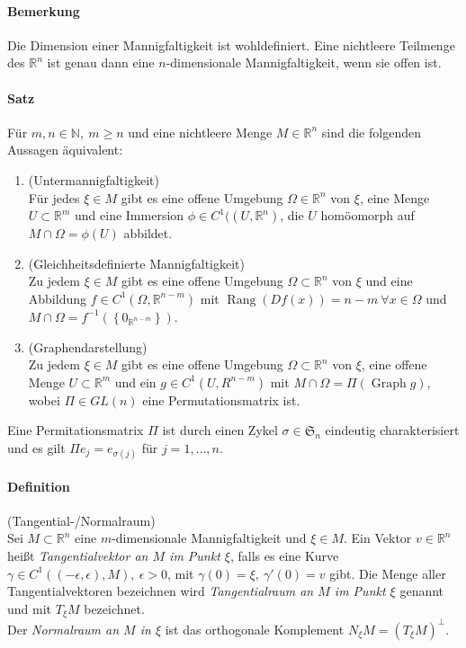 \documentclass[12pt,a4paper,fleqn]{article}
\def\set#1{{\left\{ #1 \right\}}}
\def\R{{\mathbb{R}}}
\begin{document}
\paragraph{Bemerkung} Die Dimension einer Mannigfaltigkeit ist wohldefiniert. Eine nichtleere Teilmenge des $\R^n$ ist genau dann eine $n$-dimensionale Mannigfaltigkeit, wenn sie offen ist.

\paragraph{Satz} Für $m, n \in \mathbb{N},\ m \geq n$ und eine nichtleere Menge $M \in \R^n$ sind die folgenden Aussagen äquivalent:
\begin{enumerate}
\item (Untermannigfaltigkeit)\\
Für jedes $\xi \in M$ gibt es eine offene Umgebung $\Omega \in \R^n$ von $\xi$, eine Menge ${U \subset \R^m}$ und eine Immersion $\phi \in C^1((U, \R^n)$, die $U$ homöomorph auf ${M \cap \Omega = \phi(U)}$ abbildet.
\item (Gleichheitsdefinierte Mannigfaltigkeit)\\
Zu jedem $\xi \in M$ gibt es eine offene Umgebung $\Omega \subset \R^n$ von $\xi$ und eine Abbildung $f \in C^1(\Omega, \R^{n-m})$ mit $\operatorname{Rang} (Df(x)) = n - m \ \forall x \in \Omega$ und ${M\cap \Omega = f^{-1}(\set{0_{\R^{n-m}}})}$. 
\item (Graphendarstellung)\\
Zu jedem $\xi \in M$ gibt es eine offene Umgebung $\Omega \subset \R^n$ von $\xi$, eine offene Menge $U \subset \R^m$ und ein $g \in C^1(U, R^{n-m})$ mit ${M\cap \Omega = \Pi(\operatorname{Graph} g)}$, wobei $\Pi \in GL(n)$ eine Permutationsmatrix ist.
\end{enumerate}
Eine  Permitationsmatrix $\Pi$ ist durch einen Zykel $\sigma \in \mathfrak{S}_n$ eindeutig charakterisiert und es gilt $\Pi e_j = e_{\sigma(j)}$ für $j = 1, \dots, n$.

\paragraph{Definition} (Tangential-/Normalraum)\\
Sei $M \subset \R^n$ eine $m$-dimensionale Mannigfaltigkeit und $\xi \in M$. Ein Vektor $v \in \R^n$ heißt \textit{Tangentialvektor an $M$ im Punkt $\xi$}, falls es eine Kurve $\gamma \in C^1((-\epsilon, \epsilon), M),\ {\epsilon > 0}$, mit $\gamma(0) = \xi,\ \gamma'(0) = v$ gibt.
Die Menge aller Tangentialvektoren bezeichnen wird \textit{Tangentialraum an $M$ im Punkt $\xi$} genannt und mit $T_\xi M$ bezeichnet.\\
Der \textit{Normalraum an $M$ in $\xi$} ist das orthogonale Komplement $N_\xi M = (T_\xi M)^\perp$.
\end{document}
